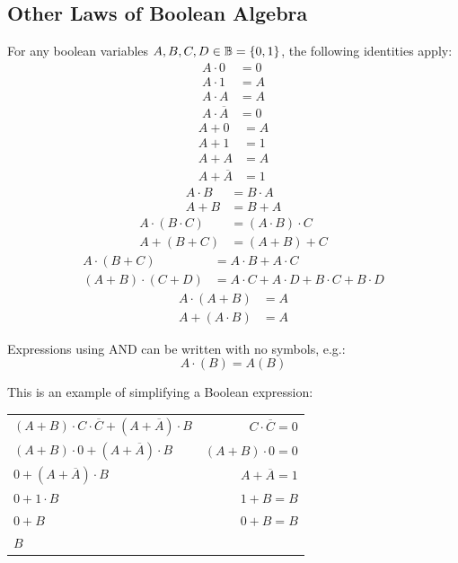         \subsection{Other Laws of Boolean Algebra}
            For any boolean variables $A,B,C,D\in\operatorname{\mathbb{B}}=\left\{0,1\right\}$, the following identities apply:
            \begin{align}
                A\cdot 0&=0 \\
                A\cdot 1&=A \\
                A\cdot A&=A \\
                A\cdot \overline{A}&=0
            \end{align}
            \begin{align}
                A+0&=A \\
                A+1&=1 \\
                A+A&=A \\
                A+\overline{A}&=1
            \end{align}
            \begin{align}
                A\cdot B&=B\cdot A \\
                A+B&=B+A
            \end{align}
            \begin{align}
                A\cdot(B\cdot C)&=(A\cdot B)\cdot C \\
                A+(B+C)&=(A+B)+C
            \end{align}
            \begin{align}
                A\cdot(B+C)&=A\cdot B+A\cdot C \\
                (A+B)\cdot(C+D)&=A\cdot C+A\cdot D+B\cdot C+B\cdot D
            \end{align}
            \begin{align}
                A\cdot(A+B)&=A \\
                A+(A\cdot B)&=A
            \end{align}

            Expressions using AND can be written with no symbols, e.g.:
            \begin{equation}
                A\cdot(B)=A(B)
            \end{equation}

            This is an example of simplifying a Boolean expression:
            \begin{center}
                \begin{tabular}{lr}
                    $(A+B)\cdot C\cdot\overline{C}+(A+\overline{A})\cdot B$ & $C\cdot\overline{C}=0$ \\
                    $(A+B)\cdot 0+(A+\overline{A})\cdot B$ & $(A+B)\cdot0=0$ \\
                    $0+(A+\overline{A})\cdot B$ & $A+\overline{A}=1$ \\
                    $0+1\cdot B$ & $1+B=B$ \\
                    $0+B$ & $0+B=B$ \\
                    $B$ & \\
                \end{tabular}
            \end{center}

